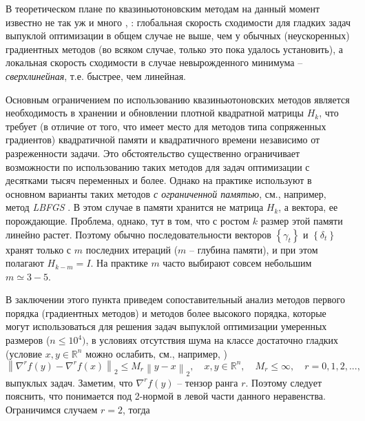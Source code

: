   В теоретическом плане по квазиньютоновским методам на данный момент известно не так уж и много \cite{nesterov2013introductory}, \cite{nocedal2006sequential}: глобальная скорость сходимости для гладких задач выпуклой оптимизации в общем случае не выше, чем у обычных (неускоренных) градиентных методов (во всяком случае, только это пока удалось установить), а локальная скорость сходимости в случае невырожденного минимума -- \textit{сверхлинейная}, т.е. быстрее, чем линейная. 

  Основным ограничением по использованию квазиньютоновских методов является необходимость в хранении и обновлении плотной квадратной матрицы $H_k $, что требует (в отличие от того, что имеет место для методов типа сопряженных градиентов) квадратичной памяти и квадратичного времени независимо от разреженности задачи. Это обстоятельство существенно ограничивает возможности по использованию таких методов для задач оптимизации с десятками тысяч переменных и более. Однако на практике используют в основном варианты таких методов \textit{с ограниченной памятью}, см., например, метод \textit{LBFGS} \cite{nocedal2006sequential}. В этом случае в памяти хранится не матрица $H_k $, а вектора, ее порождающие. Проблема, однако, тут в том, что с ростом $k$ размер этой памяти линейно растет. Поэтому обычно последовательности векторов $\left\{ {\gamma _t } \right\}$ и $\left\{ {\delta _t } \right\}$ хранят только с $m$ последних итераций ($m$ -- глубина памяти), и при этом полагают $H_{k-m} =I$. На практике $m$ часто выбирают совсем небольшим $m\simeq 3-5$.

  \iffalse
  В заключении этого пункта приведем сопоставительный анализ методов первого порядка (градиентных методов) и методов более высокого порядка, которые могут использоваться для решения задач выпуклой оптимизации умеренных размеров ($n\le 10^4)$, в условиях отсутствия шума на классе достаточно гладких (условие $x,y\in \mathbb{R}^n$ можно ослабить, см., например, \cite{gasnikov2018global})
  \[
  \left\| {\nabla ^rf\left( y \right)-\nabla ^rf\left( x \right)} \right\|_2 
  \le M_r \left\| {y-x} \right\|_2 ,
  \quad
  x,y\in \mathbb{R}^n,
  \quad
  M_r \le \infty ,
  \quad
  r=0,1,2,...,
  \]
  выпуклых задач. Заметим, что $\nabla ^rf\left( y \right)$ -- тензор ранга $r$. Поэтому следует пояснить, что понимается под 2-нормой в левой части данного неравенства. Ограничимся случаем $r=2$, тогда


